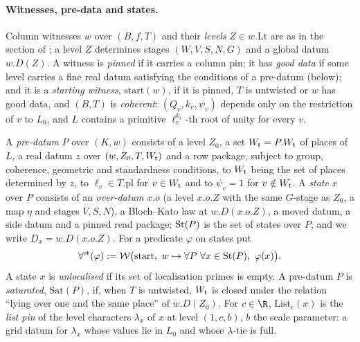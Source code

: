 \paragraph{Witnesses, pre-data and states.} Column witnesses $w$ over $(B,f,T)$ and their \emph{levels}
$Z\in w.\mathrm{Lt}$ are as in the section of
; a level $Z$ determines stages
$(W,V,S,N,G)$ and a global datum $w.D(Z)$. A witness is \emph{pinned} if it carries a column pin; it has
\emph{good data} if some level carries a fine real datum satisfying the conditions of a pre-datum (below);
and it is a \emph{starting witness}, $\mathrm{start}(w)$, if it is pinned, $T$ is untwisted or $w$ has good
data, and $(B,T)$ is \emph{coherent}: $(Q_v,k_v,\psi_v)$ depends only on the restriction of $v$ to $L_0$, and
$L$ contains a primitive $\ell_v^{k_v}$-th root of unity for every $v$.

A \emph{pre-datum} $P$ over $(K,w)$ consists of a level $Z_0$, a set $W_{\mathrm{t}}=P.W_{\mathrm{t}}$ of places of $L$, a
real datum $z$ over $(w,Z_0,T,W_{\mathrm{t}})$ and a row package, subject to group, coherence, geometric and
standardness conditions, to $W_{\mathrm{t}}$ being the set of places determined by $z$, to $\ell_v\in T.\mathrm{pl}$
for $v\in W_{\mathrm{t}}$ and to $\psi_v=1$ for $v\notin W_{\mathrm{t}}$. A \emph{state} $x$ over $P$ consists of an
\emph{over-datum} $x.o$ (a level $x.o.Z$ with the same $G$-stage as $Z_0$, a map $\eta$ and stages $V,S,N$), a
Bloch--Kato law at $w.D(x.o.Z)$, a moved datum, a side datum and a pinned read package; $\mathrm{St}(P)$ is the
set of states over $P$, and we write $D_x=w.D(x.o.Z)$. For a predicate $\varphi$ on states put
\[
  \forall^{\mathrm{st}}(\varphi):=\mathcal{W}\bigl(\mathrm{start},\ w\mapsto \forall P\ \forall x\in\bltwoSt(P),\ \varphi(x)\bigr).
\]
A state $x$ is \emph{unlocalised} if its set of localisation primes is empty. A pre-datum $P$ is
\emph{saturated}, $\mathrm{Sat}(P)$, if, when $T$ is untwisted, $W_{\mathrm{t}}$ is closed under the relation ``lying
over one and the same place'' of $w.D(Z_0)$. For $c\in\R$, $\mathrm{List}_c(x)$ is the \emph{list pin} of
the level characters $\lambda_x$ of $x$ at level $(1,c,b)$, $b$ the scale parameter: a grid datum for
$\lambda_x$ whose values lie in $L_0$ and whose $\lambda$-tie is full.

